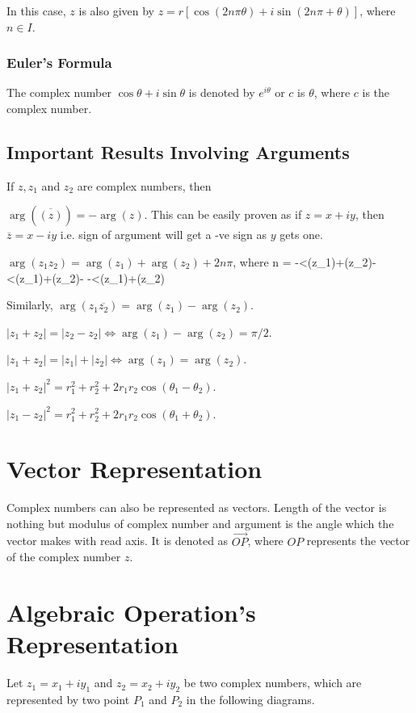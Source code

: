 In this case, $z$ is also given by $z = r[\cos(2n\pi  \theta) + i\sin(2n\pi + \theta)]$, where $n\in I$.

\subsubsection{Euler's Formula}
The complex number $\cos\theta + i\sin\theta$ is denoted by $e^{i\theta}$ or $c$ is $\theta$, where $c$ is the complex number.

\subsection{Important Results Involving Arguments}
If $z, z_1$ and $z_2$ are complex numbers, then

\startitemize[n]
\item $\arg(\overline{(z)}) = -\arg(z)$. This can be easily proven as if $z = x + iy$, then $\overline{z} = x - iy$ i.e. sign of
  argument will get a -ve sign as $y$ gets one.
\item $\arg(z_1z_2) = \arg(z_1)  + \arg(z_2) + 2n\pi$, where
  \startformula n = \startmathcases
    \;\; \NC -\pi<\arg(z_1)+\arg(z_2)\leq-\pi\NR
    \;\; \pi<\arg(z_1)+\arg(z_2)\leq-\pi\NR
    \;\; \NC -\pi<\arg(z_1)+\arg(z_2)\pi\NR\stopmathcases\stopformula
 \item Similarly, $\arg(z_1\overline{z_2}) = \arg(z_1) - \arg(z_2)$.
 \item $|z_1 + z_2| = |z_2 - z_2| \Leftrightarrow \arg(z_1) - \arg(z_2) = \pi/2$.
 \item $|z_1 + z_2| = |z_1| + |z_2| \Leftrightarrow \arg(z_1) = \arg(z_2)$.
 \item $|z_1 + z_2|^2 = r_1^2 + r_2^2 + 2r_1r_2\cos(\theta_1 - \theta_2)$.
 \item $|z_1 - z_2|^2 = r_1^2 +r_2^2 + 2r_1r_2\cos(\theta_1 + \theta_2)$.
\stopitemize

\section{Vector Representation}
Complex numbers can also be represented as vectors. Length of the vector is nothing but modulus of complex number and argument is
the angle which the vector makes with read axis. It is denoted as $\overrightarrow{OP}$, where $OP$ represents the vector of the
complex number $z$.

\section{Algebraic Operation's Representation}
Let $z_1 = x_1 + iy_1$ and $z_2 = x_2 + iy_2$ be two complex numbers, which are represented by two point $P_1$ and $P_2$ in the
following diagrams.

